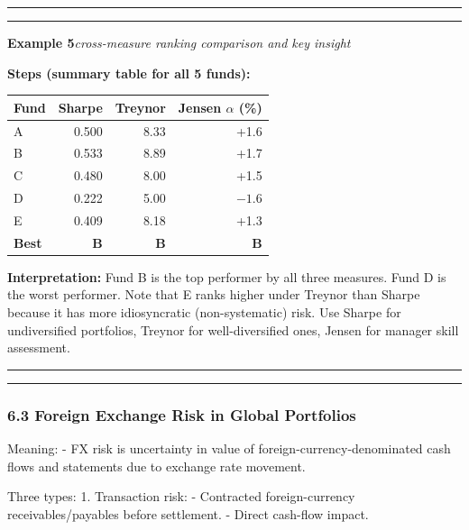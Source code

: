 \documentclass[
]{article}
\begin{document}
\noindent\rule{\linewidth}{0.4pt}
\medskip
\noindent\rule{\linewidth}{0.4pt}
\noindent\textbf{Example 5}\enspace\textit{cross-measure ranking comparison and key insight}

\noindent\textbf{Steps (summary table for all 5 funds):}
\begin{center}
\begin{tabular}{|l|r|r|r|}
\hline
\textbf{Fund} & \textbf{Sharpe} & \textbf{Treynor} & \textbf{Jensen $\alpha$ (\%)}\\
\hline
A & 0.500 & 8.33 & +1.6\\
B & 0.533 & 8.89 & +1.7\\
C & 0.480 & 8.00 & +1.5\\
D & 0.222 & 5.00 & $-1.6$\\
E & 0.409 & 8.18 & +1.3\\
\hline
\textbf{Best} & \textbf{B} & \textbf{B} & \textbf{B}\\
\hline
\end{tabular}
\end{center}

\noindent\textbf{Interpretation:} Fund B is the top performer by all three measures. Fund D is the worst performer. Note that E ranks higher under Treynor than Sharpe because it has more idiosyncratic (non-systematic) risk. Use Sharpe for undiversified portfolios, Treynor for well-diversified ones, Jensen for manager skill assessment.

\noindent\rule{\linewidth}{0.4pt}
\medskip

\begin{center}\rule{0.5\linewidth}{0.5pt}\end{center}

\hypertarget{foreign-exchange-risk-in-global-portfolios}{%
\subsubsection{6.3 Foreign Exchange Risk in Global
Portfolios}\label{foreign-exchange-risk-in-global-portfolios}}

Meaning: - FX risk is uncertainty in value of
foreign-currency-denominated cash flows and statements due to exchange
rate movement.

Three types: 1. Transaction risk: - Contracted foreign-currency
receivables/payables before settlement. - Direct cash-flow impact.
\end{document}
